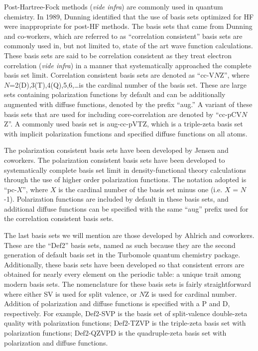 \begin{doublespace}
Post-Hartree-Fock methods (\emph{vide infra}) are commonly used in quantum
chemistry. In 1989, Dunning\cite{Dunning1989, Kendall1992, Woon1994} identified
that the use of basis sets optimized for HF were inappropriate for post-HF
methods. The basis sets that came from Dunning and co-workers, which are
referred to as ``correlation consistent'' basis sets are commonly used in, but
not limited to, state of the art wave function calculations. These basis sets
are said to be correlation consistent as they treat electron correlation
(\emph{vide infra}) in a manner that systematically approached the complete
basis set limit. Correlation consistent basis sets are denoted as ``cc-V$N$Z'',
where $N$=2(D),3(T),4(Q),5,6,\ldots is the cardinal number of the basis set.
These are large sets containing polarization functions by default and can be
additionally augmented with diffuse functions, denoted by the prefix ``aug.'' A
variant of these basis sets that are used for including core-correlation are
denoted by ``cc-pCV$N$Z''.\cite{Peterson2002} A commonly used basis set is
aug-cc-pVTZ, which is a triple-zeta basis set with implicit polarization
functions and specified diffuse functions on all atoms.

\vspace{3mm}
\vspace{1mm}

The polarization consistent basis sets have been developed by Jensen and
coworkers.\cite{Jensen2001, Jensen2002, Jensen2002a, Jensen2003} The
polarization consistent basis sets have been developed to systematically
complete basis set limit in density-functional theory calculations through the
use of higher order polarization functions. The notation adopted is ``pc-$X$'',
where $X$ is the cardinal number of the basis set minus one (i.e. $X$ = $N$-1).
Polarization functions are included by default in these basis sets, and
additional diffuse functions can be specified with the same ``aug'' prefix used
for the correlation consistent basis sets.

\vspace{3mm}
\vspace{1mm}

The last basis sets we will mention are those developed by Ahlrich and
coworkers.\cite{Schafer1992, Weigend2005} These are the ``Def2'' basis sets,
named as such because they are the second generation of default basis set in
the Turbomole quantum chemistry package.\cite{turbomole} Additionally, these
basis sets have been developed so that consistent errors are obtained for
nearly every element on the periodic table: a unique trait among modern basis
sets. The nomenclature for these basis sets is fairly straightforward where
either SV is used for split valence, or $N$Z is used for cardinal number.
Addition of polarization and diffuse functions is specified with a P and D,
respectively. For example, Def2-SVP is the basis set of split-valence
double-zeta quality with polarization functions; Def2-TZVP is the triple-zeta
basis set with polarization functions; Def2-QZVPD is the quadruple-zeta basis
set with polarization and diffuse functions.


\end{doublespace}
